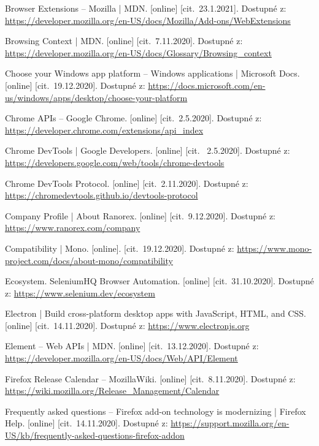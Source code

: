 \begin{flushleft}
\begin{thebibliography}{99}
Browser Extensions -- Mozilla | MDN. [online] [cit.~23.1.2021]. Dostupné z: \url{https://developer.mozilla.org/en-US/docs/Mozilla/Add-ons/WebExtensions}

 Browsing Context | MDN. [online] [cit.~7.11.2020]. Dostupné z: \url{https://developer.mozilla.org/en-US/docs/Glossary/Browsing_context}

 Choose your Windows app platform -- Windows applications | Microsoft Docs. [online] [cit.~19.12.2020]. Dostupné z: \url{https://docs.microsoft.com/en-us/windows/apps/desktop/choose-your-platform}

 Chrome APIs -- Google Chrome. [online] [cit.~2.5.2020]. Dostupné z: \url{https://developer.chrome.com/extensions/api_index}

 Chrome DevTools | Google Developers. [online] [cit.~	2.5.2020]. Dostupné z: \url{https://developers.google.com/web/tools/chrome-devtools}

 Chrome DevTools Protocol. [online] [cit.~2.11.2020]. Dostupné z: \url{https://chromedevtools.github.io/devtools-protocol}

 Company Profile | About Ranorex. [online] [cit.~9.12.2020]. Dostupné z: \url{https://www.ranorex.com/company}

 Compatibility | Mono. [online]. [cit.~19.12.2020]. Dostupné z: \url{https://www.mono-project.com/docs/about-mono/compatibility}

 Ecosystem. SeleniumHQ Browser Automation. [online] [cit.~31.10.2020]. Dostupné z: \url{https://www.selenium.dev/ecosystem}

 Electron | Build cross-platform desktop apps with JavaScript, HTML, and CSS. [online] [cit.~14.11.2020]. Dostupné z: \url{https://www.electronjs.org}

 Element -- Web APIs | MDN. [online] [cit.~13.12.2020]. Dostupné z: \url{https://developer.mozilla.org/en-US/docs/Web/API/Element}

 Firefox Release Calendar -- MozillaWiki. [online] [cit.~8.11.2020]. Dostupné z: \url{https://wiki.mozilla.org/Release_Management/Calendar}

 Frequently asked questions -- Firefox add-on technology is modernizing | Firefox Help. [online] [cit.~14.11.2020]. Dostupné z: \url{https://support.mozilla.org/en-US/kb/frequently-asked-questions-firefox-addon}


\end{thebibliography}
\end{flushleft}
